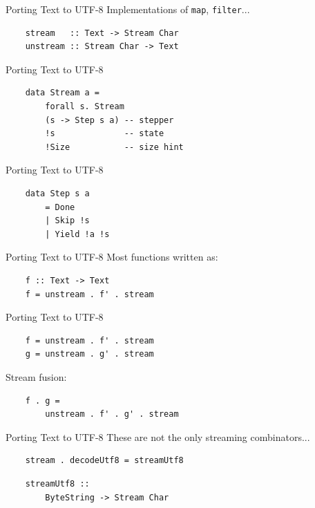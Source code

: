 \documentclass[20pt]{beamer}
\newcommand{\vspaced}{
    \vspace{5mm}
}
\begin{document}
\begin{frame}[fragile]{Porting Text to UTF-8}
    Implementations of \texttt{map}, \texttt{filter}...
    \vspaced
    \begin{lstlisting}
    stream   :: Text -> Stream Char
    unstream :: Stream Char -> Text
    \end{lstlisting}
\end{frame}

\begin{frame}[fragile]{Porting Text to UTF-8}
    \begin{lstlisting}
    data Stream a =
        forall s. Stream
        (s -> Step s a) -- stepper
        !s              -- state
        !Size           -- size hint
    \end{lstlisting}
\end{frame}

\begin{frame}[fragile]{Porting Text to UTF-8}
    \begin{lstlisting}
    data Step s a
        = Done
        | Skip !s
        | Yield !a !s
    \end{lstlisting}
\end{frame}

\begin{frame}[fragile]{Porting Text to UTF-8}
    Most functions written as:
    \vspaced
    \begin{lstlisting}
    f :: Text -> Text
    f = unstream . f' . stream
    \end{lstlisting}
\end{frame}

\begin{frame}[fragile]{Porting Text to UTF-8}
    \begin{lstlisting}
    f = unstream . f' . stream
    g = unstream . g' . stream
    \end{lstlisting}
    \vspaced
    Stream fusion: \\
    \begin{lstlisting}
    f . g =
        unstream . f' . g' . stream
    \end{lstlisting}
\end{frame}

\begin{frame}[fragile]{Porting Text to UTF-8}
    These are not the only streaming combinators...
    \vspaced
    \begin{lstlisting}
    stream . decodeUtf8 = streamUtf8
    \end{lstlisting}
    \vspaced
    \begin{lstlisting}
    streamUtf8 ::
        ByteString -> Stream Char
    \end{lstlisting}
\end{frame}
\end{document}
